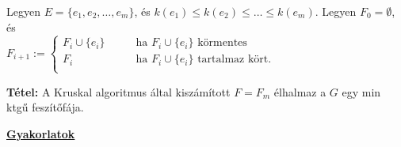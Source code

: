 \documentclass[a4paper]{article}
\newcommand{\0}{{\bf 0}}
\newcommand{\tetel}{{\bf Tétel:} }
\begin{document}
    Legyen $E=\{e_1,e_2,\ldots,e_m\}$, és $k(e_1)\le
    k(e_2)\le\ldots\le k(e_m)$. Legyen $F_0=\emptyset$, és\\
    \hfil $F_{i+1}:=\left\{
    \begin{array}{ll}
    F_i\cup \{e_i\}\qquad&\mbox{ha  }F_i\cup \{e_i\}\mbox{ körmentes}\\
    F_i&\mbox{ha  }F_i\cup \{e_i\}\mbox{ tartalmaz kört.}\\
    \end{array}
    \right.$
    
    \tetel A Kruskal algoritmus által kiszámított $F=F_m$ élhalmaz a $G$ egy
    min ktgű feszítőfája.
    
    \fi
    
    
    \noindent
    {\bf\large\underline{Gyakorlatok}}
    \vspace*{-.2em}
\end{document}
